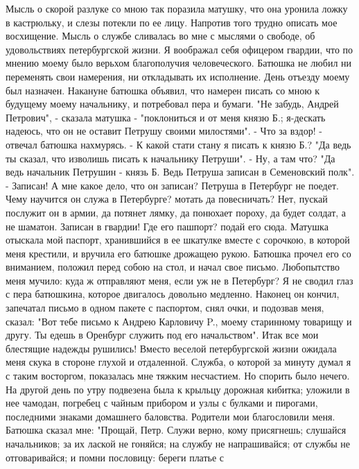 Мысль о скорой  разлуке со  мною  так поразила матушку, что она уронила
ложку в кастрюльку, и слезы потекли по ее лицу. Напротив того трудно описать
мое  восхищение.  Мысль  о службе сливалась во мне  с  мыслями о свободе, об
удовольствиях петербургской жизни. Я воображал себя офицером гвардии, что по
мнению моему было верьхом благополучия человеческого.
Батюшка  не  любил  ни  переменять свои намерения,  ни  откладывать  их
исполнение.  День отъезду  моему был назначен. Накануне батюшка объявил, что
намерен писать со  мною к будущему моему начальнику,  и  потребовал  пера  и
бумаги.
"Не забудь,  Андрей Петрович", -  сказала  матушка  - "поклониться и от
меня  князю  Б.;  я-дескать  надеюсь,  что  он  не  оставит  Петрушу  своими
милостями".
-  Что за вздор! - отвечал  батюшка нахмурясь.  - К какой стати стану я
писать к князю Б.?
"Да ведь ты сказал, что изволишь писать к начальнику Петруши".
- Ну, а там что?
"Да  ведь  начальник  Петрушин  -  князь  Б.  Ведь  Петруша  записан  в
Семеновский полк".
- Записан! А  мне  какое дело,  что он записан? Петруша в Петербург  не
поедет. Чему  научится он  служа  в  Петербурге? мотать да повесничать? Нет,
пускай  послужит он в армии, да потянет лямку,  да понюхает пороху, да будет
солдат, а не шаматон. Записан в гвардии! Где его пашпорт? подай его сюда.
Матушка  отыскала  мой  паспорт,  хранившийся  в ее  шкатулке  вместе с
сорочкою, в  которой меня  крестили, и вручила  его батюшке  дрожащею рукою.
Батюшка прочел его  со вниманием, положил перед собою на стол, и начал  свое
письмо.
Любопытство  меня  мучило:  куда  ж  отправляют  меня,  если  уж  не  в
Петербург? Я не  сводил глаз с  пера батюшкина,  которое двигалось  довольно
медленно. Наконец он кончил,  запечатал письмо в одном  пакете  с паспортом,
снял очки, и подозвав меня, сказал: "Вот тебе письмо к  Андрею Карловичу P.,
моему старинному  товарищу и  другу. Ты едешь  в Оренбург  служить  под  его
начальством".
Итак все мои блестящие надежды  рушились! Вместо  веселой петербургской
жизни ожидала меня скука в стороне глухой и отдаленной. Служба, о которой за
минуту  думал  я  с  таким восторгом, показалась  мне тяжким  несчастием. Но
спорить было  нечего.  На  другой день  по  утру  подвезена  была  к крыльцу
дорожная кибитка; уложили в нее чамодан, погребец с чайным прибором и узлы с
булками  и пирогами, последними  знаками  домашнего баловства.  Родители мои
благословили меня.  Батюшка сказал  мне:  "Прощай, Петр.  Служи  верно, кому
присягнешь; слушайся  начальников;  за их  лаской  не гоняйся;  на службу не
напрашивайся; от службы не отговаривайся; и помни пословицу: береги платье с
